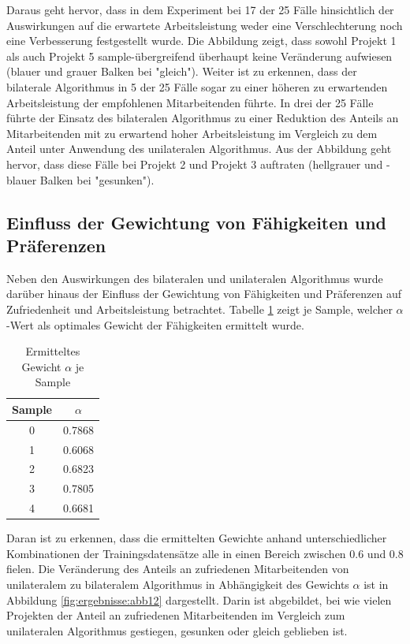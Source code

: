 Daraus geht hervor, dass in dem Experiment bei 17 der 25 Fälle hinsichtlich der Auswirkungen auf die erwartete Arbeitsleistung weder eine Verschlechterung noch eine Verbesserung festgestellt wurde.
Die Abbildung zeigt, dass sowohl Projekt 1 als auch Projekt 5 sample-übergreifend überhaupt keine Veränderung aufwiesen (blauer und grauer Balken bei "gleich").
Weiter ist zu erkennen, dass der bilaterale Algorithmus in 5 der 25 Fälle sogar zu einer höheren zu erwartenden Arbeitsleistung der empfohlenen Mitarbeitenden führte. 
In drei der 25 Fälle führte der Einsatz des bilateralen Algorithmus zu einer Reduktion des Anteils an Mitarbeitenden mit zu erwartend hoher Arbeitsleistung im Vergleich zu dem Anteil unter Anwendung des unilateralen Algorithmus.
Aus der Abbildung geht hervor, dass diese Fälle bei Projekt 2 und Projekt 3 auftraten (hellgrauer und -blauer Balken bei "gesunken").

\subsection{Einfluss der Gewichtung von Fähigkeiten und Präferenzen}
Neben den Auswirkungen des bilateralen und unilateralen Algorithmus wurde darüber hinaus der Einfluss der Gewichtung von Fähigkeiten und Präferenzen auf Zufriedenheit und Arbeitsleistung betrachtet.
Tabelle \ref{tab:ergebnisse:tab1} zeigt je Sample, welcher $\alpha$-Wert als optimales Gewicht der Fähigkeiten ermittelt wurde.

\begin{table}[htbp]
    \begin{center}
    \begin{tabular}{c|c}
    {\textbf{Sample}} & {\boldmath$\alpha$}\\
    \hline
    0 & 0.7868 \\
    \hline
	1 & 0.6068 \\
    \hline
    2 & 0.6823 \\
    \hline
	3 & 0.7805 \\
    \hline
	4 & 0.6681 \\
    \end{tabular}
    \end{center}
    \caption[Ermitteltes Gewicht $\alpha$ je Sample]{Ermitteltes Gewicht $\alpha$ je Sample}
	\label{tab:ergebnisse:tab1}
\end{table}

Daran ist zu erkennen, dass die ermittelten Gewichte anhand unterschiedlicher Kombinationen der Trainingsdatensätze alle in einen Bereich zwischen 0.6 und 0.8 fielen.
Die Veränderung des Anteils an zufriedenen Mitarbeitenden von unilateralem zu bilateralem Algorithmus in Abhängigkeit des Gewichts $\alpha$ ist in Abbildung \ref{fig:ergebnisse:abb12} dargestellt.
Darin ist abgebildet, bei wie vielen Projekten der Anteil an zufriedenen Mitarbeitenden im Vergleich zum unilateralen Algorithmus gestiegen, gesunken oder gleich geblieben ist.

